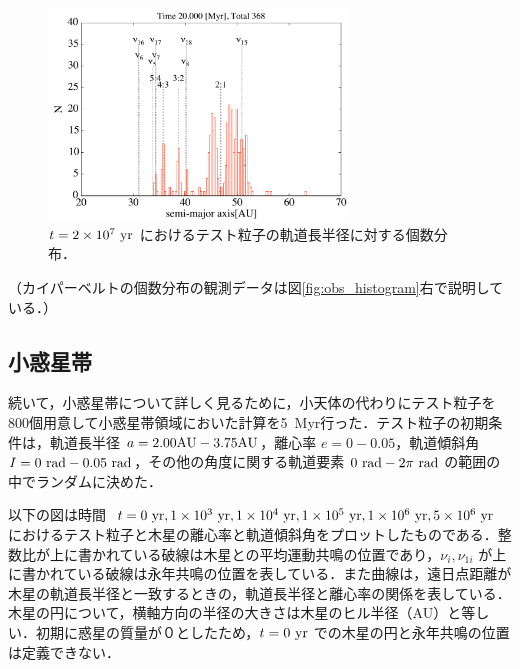 \documentclass[11pt,a4paper,oneside,onecolumn]{jreport}
\begin{document}
\begin{figure}[H]
\centering
\includegraphics[width=8cm]{./image/kuiper_histogram_20Myr.pdf}
\caption{$t = 2 \times 10^7\ {\rm yr}$ におけるテスト粒子の軌道長半径に対する個数分布．\label{fig:kuiper_histogram_20Myr}}
\end{figure}

（カイパーベルトの個数分布の観測データは図\ref{fig:obs_histogram}右で説明している．）
\\


\subsection{小惑星帯}
続いて，小惑星帯について詳しく見るために，小天体の代わりにテスト粒子を800個用意して小惑星帯領域においた計算を5\ Myr行った．テスト粒子の初期条件は，軌道長半径 $a = 2.00 {\rm AU} - 3.75 {\rm AU}$，離心率 $e = 0 - 0.05$，軌道傾斜角 $I = 0\ {\rm rad} - 0.05\ {\rm rad}$，その他の角度に関する軌道要素 $0\ {\rm rad} - 2 \pi\ {\rm rad}$ の範囲の中でランダムに決めた．

以下の図は時間 $t = 0\ {\rm yr}, 1 \times 10^3\ {\rm yr}, 1 \times 10^4\ {\rm yr}, 1 \times 10^5\ {\rm yr}, 1 \times 10^6\ {\rm yr}, 5 \times 10^6\ {\rm yr}$ におけるテスト粒子と木星の離心率と軌道傾斜角をプロットしたものである．整数比が上に書かれている破線は木星との平均運動共鳴の位置であり，$\nu_i, \nu_{1i}$ が上に書かれている破線は永年共鳴の位置を表している．また曲線は，遠日点距離が木星の軌道長半径と一致するときの，軌道長半径と離心率の関係を表している．木星の円について，横軸方向の半径の大きさは木星のヒル半径（AU）と等しい．初期に惑星の質量が０としたため，$t = 0\ {\rm yr}$ での木星の円と永年共鳴の位置は定義できない．
\end{document}
